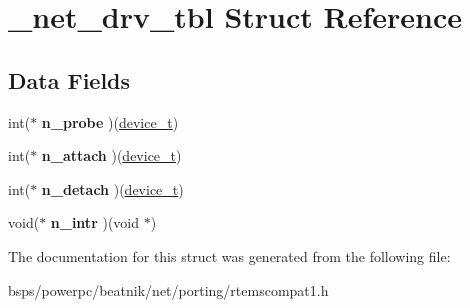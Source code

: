\hypertarget{struct__net__drv__tbl}{}\section{\+\_\+net\+\_\+drv\+\_\+tbl Struct Reference}
\label{struct__net__drv__tbl}
\subsection*{Data Fields}
\begin{DoxyCompactItemize}
\item 
\mbox{\label{struct__net__drv__tbl_a93858685ccfd5a82c1e69ffc6799c7b4}} 
int($\ast$ {\bfseries n\+\_\+probe} )(\mbox{\hyperlink{structdevice}{device\+\_\+t}})
\item 
\mbox{\label{struct__net__drv__tbl_afa8a9fcd85360b1cf59578c49dfaf188}} 
int($\ast$ {\bfseries n\+\_\+attach} )(\mbox{\hyperlink{structdevice}{device\+\_\+t}})
\item 
\mbox{\label{struct__net__drv__tbl_a8463b06faa7cb9ee6955fccf34b89116}} 
int($\ast$ {\bfseries n\+\_\+detach} )(\mbox{\hyperlink{structdevice}{device\+\_\+t}})
\item 
\mbox{\label{struct__net__drv__tbl_a1b7fbefce8bbfd7793b4f8c3151f683e}} 
void($\ast$ {\bfseries n\+\_\+intr} )(void $\ast$)
\end{DoxyCompactItemize}


The documentation for this struct was generated from the following file\+:\begin{DoxyCompactItemize}
\item 
bsps/powerpc/beatnik/net/porting/rtemscompat1.\+h\end{DoxyCompactItemize}

